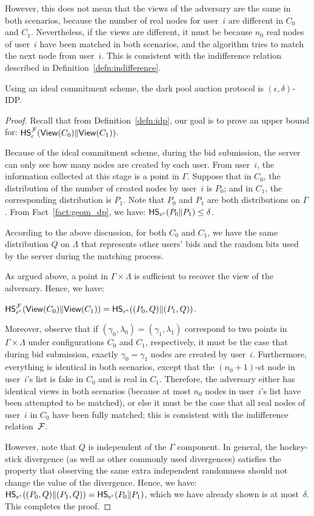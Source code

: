 However, this does not mean that the views of the adversary are the same in
both scenarios, because the number of real nodes for user~$i$ are different
in $C_0$ and $C_1$.  Nevertheless, if the views are different,
it must be because $n_0$ real nodes of user~$i$ have been matched
in both scenarios, and the algorithm tries to match the next node from user~$i$.
This is consistent with the indifference relation
described in Definition~\ref{defn:indifference}.

\begin{lemma}
Using an ideal commitment scheme,
the dark pool auction protocol is $(\epsilon, \delta)$-IDP.
\end{lemma}

\begin{proof}
Recall that from Definition~\ref{defn:idp},
our goal is to prove an upper bound for:
${\sf HS}^{\mathcal {F}}_{\epsilon}({\mathsf {View}}(C_0) \| {\mathsf {View}}(C_1))$.

Because of the ideal commitment scheme,
during the bid submission, the server can only see
how many nodes are created by each user.
From user~$i$, the information collected at this stage 
is a point in $\Gamma$.
Suppose that in $C_0$, the distribution of the number of created nodes by user~$i$ is $P_0$;
and in $C_1$, the corresponding distribution is $P_1$.
Note that $P_0$ and $P_1$ are both distributions on $\Gamma$.
From Fact~\ref{fact:geom_dp},
we have: 
${\sf HS}_{e^\epsilon}(P_0\| P_1) \leq \delta$.


According to the above discussion,
for both $C_0$ and $C_1$,
we have the same distribution $Q$ on $\Lambda$
that represents other users' bids and the random bits used by the server during
the matching process.

As argued above, a point in $\Gamma \times \Lambda$
is sufficient to recover the view of the adversary.
Hence,
we have:

${\sf HS}^{\mathcal {F}}_{e^\epsilon}({\mathsf {View}}(C_0) \| {\mathsf {View}}(C_1))
= {\sf HS}_{e^\epsilon}((P_0, Q) \| (P_1, Q))$.

Moreover, observe that if $(\gamma_0, \lambda_0) = (\gamma_1, \lambda_1)$
correspond to two points in $\Gamma \times \Lambda$
under configurations $C_0$ and $C_1$, respectively,
it must be the case that during bid submission,
exactly $\gamma_0 = \gamma_1$ nodes are created by user~$i$.
Furthermore, everything is identical in both scenarios,
except that the $(n_0 + 1)$-st node in user~$i$'s list
is fake in $C_0$ and is real in $C_1$.
Therefore, the adversary either has identical views
in both scenarios (because at most
$n_0$ nodes in user~$i$'s list have been attempted to be matched), or else it must be the case that 
all real nodes of user~$i$ in $C_0$ have been fully matched;
this is consistent with the indifference relation~$\mathcal {F}$.


However, note that $Q$ is independent of the $\Gamma$ component.
In general, the hockey-stick divergence (as well as other commonly used divergences)
satisfies the property that observing the same extra independent randomness
should not change the value of the divergence.
Hence, 
we have:
${\sf HS}_{e^\epsilon}((P_0, Q) \| (P_1, Q)) = {\sf HS}_{e^\epsilon}(P_0\| P_1)$,
which we have already shown is at most~$\delta$.  This completes the proof.
\end{proof}
